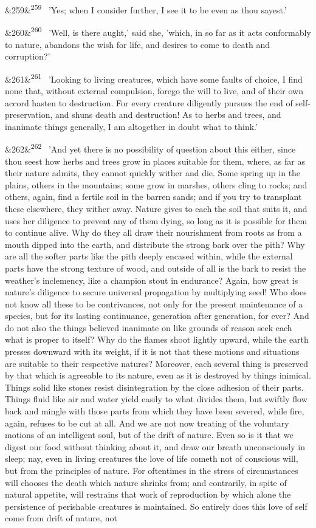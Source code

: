 \documentclass[12pt]{article}
\newcommand{\para}[1][]{\par\noindent\ifx&#1&\else\textsuperscript{\footnotesize #1}~\fi}
\begin{document}
\para[259] 'Yes; when I consider further, I see it to be even as thou sayest.'

\para[260] 'Well, is there aught,' said she, 'which, in so far as it acts conformably to nature, abandons the wish for life, and desires to come to death and corruption?'

\para[261] 'Looking to living creatures, which have some faults of choice, I find none that, without external compulsion, forego the will to live, and of their own accord hasten to destruction. For every creature diligently pursues the end of self-preservation, and shuns death and destruction! As to herbs and trees, and inanimate things generally, I am altogether in doubt what to think.'

\para[262] 'And yet there is no possibility of question about this either, since thou seest how herbs and trees grow in places suitable for them, where, as far as their nature admits, they cannot quickly wither and die. Some spring up in the plains, others in the mountains; some grow in marshes, others cling to rocks; and others, again, find a fertile soil in the barren sands; and if you try to transplant these elsewhere, they wither away. Nature gives to each the soil that suits it, and uses her diligence to prevent any of them dying, so long as it is possible for them to continue alive. Why do they all draw their nourishment from roots as from a mouth dipped into the earth, and distribute the strong bark over the pith? Why are all the softer parts like the pith deeply encased within, while the external parts have the strong texture of wood, and outside of all is the bark to resist the weather's inclemency, like a champion stout in endurance? Again, how great is nature's diligence to secure universal propagation by multiplying seed! Who does not know all these to be contrivances, not only for the present maintenance of a species, but for its lasting continuance, generation after generation, for ever? And do not also the things believed inanimate on like grounds of reason seek each what is proper to itself? Why do the flames shoot lightly upward, while the earth presses downward with its weight, if it is not that these motions and situations are suitable to their respective natures? Moreover, each several thing is preserved by that which is agreeable to its nature, even as it is destroyed by things inimical. Things solid like stones resist disintegration by the close adhesion of their parts. Things fluid like air and water yield easily to what divides them, but swiftly flow back and mingle with those parts from which they have been severed, while fire, again, refuses to be cut at all. And we are not now treating of the voluntary motions of an intelligent soul, but of the drift of nature. Even so is it that we digest our food without thinking about it, and draw our breath unconsciously in sleep; nay, even in living creatures the love of life cometh not of conscious will, but from the principles of nature. For oftentimes in the stress of circumstances will chooses the death which nature shrinks from; and contrarily, in spite of natural appetite, will restrains that work of reproduction by which alone the persistence of perishable creatures is maintained. So entirely does this love of self come from drift of nature, not 
\end{document}

